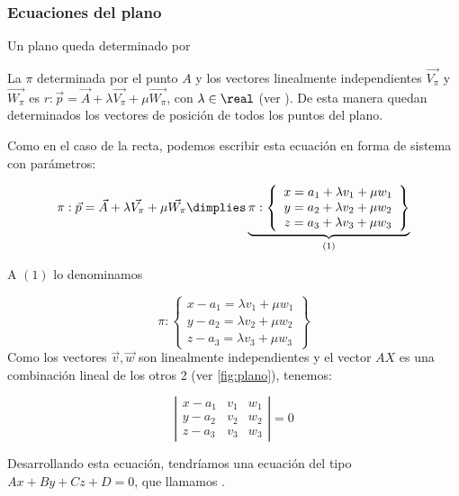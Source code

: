 \subsubsection{Ecuaciones del plano}

Un plano queda determinado por 

La 
%
%
$\pi$ determinada por el punto $A$ y los vectores linealmente independientes $\vec{V_{\pi}}$ y $\vec{W_{\pi}}$  es $r : \vec{p} = \vec{A} + \lambda \vec{V_{\pi}} + \mu\vec{W_{\pi}}$, con $\lambda\in\real$ (ver ). De esta manera quedan determinados los vectores de posición de todos los puntos del plano.

Como en el caso de la recta, podemos escribir esta ecuación en forma de sistema con parámetros:

$$\pi : \vec{p} = \vec{A} + \lambda \vec{V_{\pi}} + \mu\vec{W_{\pi}}\dimplies \underbrace{\pi:\displaystyle \left\{\begin{array}{c} x = a_1 + \lambda v_1 + \mu w_1\\y = a_2 + \lambda v_2 + \mu w_2 \\ z = a_3 + \lambda v_3 + \mu w_3 \end{array}\right\}}_{(1)} $$

 A $(1)$ lo denominamos 

\[
\pi:\displaystyle \left\{
\begin{array}{c} 
x - a_1 = \lambda v_1 + \mu w_1\\
y - a_2 = \lambda v_2 + \mu w_2 \\ 
z - a_3 = \lambda v_3 + \mu w_3 
\end{array}\right\}
\]
Como los vectores $\vec{v},\vec{w}$ son linealmente independientes y el vector $AX$ es una combinación lineal de los otros 2 (ver \ref{fig:plano}), tenemos:

\[
\left|
\begin{array}{ccc} 
x - a_1 & v_1 & w_1\\
y - a_2 & v_2 & w_2 \\ 
z - a_3 & v_3 & w_3 
\end{array}\right| = 0
\]

Desarrollando esta ecuación, tendríamos una ecuación del tipo $Ax+By+Cz + D = 0$, que llamamos .


